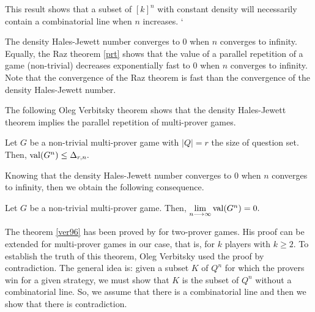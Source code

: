 
 
This result shows that  a subset of $[k]^n$ with constant density 
will  necessarily contain  a combinatorial line when $n$ increases.
`

The density Hales-Jewett number converges to $0$ when $n$ converges to infinity. Equally, the Raz theorem \eqref{prt} shows that the value of a parallel repetition of a game (non-trivial) decreases exponentially  fast to $0$ when $n$ converges to infinity.  Note that the convergence of the Raz theorem is fast
than the convergence of the  density Hales-Jewett number.
  
The following Oleg Verbitsky theorem  shows that the density Hales-Jewett theorem implies the parallel repetition of multi-prover games.

\begin{thm}	 Let $G$ be a non-trivial multi-prover game with $|Q|=r$ the size of question set. Then, 
  $\mathrm{val} (G^n) \leq \Delta_{r,n}.$	\label{ver96} \end{thm}

Knowing that the density Hales-Jewett number converges to $0$ when $n$ converges to infinity, then we obtain the following consequence.
\begin{cor}	Let $G$ be a non-trivial multi-prover game. Then, $\lim\limits_{n\longrightarrow \infty} \mathrm{val} (G^n)=0.$ 	\end{cor}

The theorem \eqref{ver96}  has been proved by \cite{verbitsky1996towards} for two-prover games.  His proof can be extended for  multi-prover games in our case,  that is, for $k$ players with $k\geq 2.$ To establish the truth of  this theorem, Oleg Verbitsky used the proof by contradiction. The general idea is: given a subset $K$ of $Q^n$ for which the provers win   for a given strategy, we must show that $K$ is  the subset  of $Q^n$ without a combinatorial line.
So, we assume that there is a combinatorial line and then we show that there is  contradiction.


